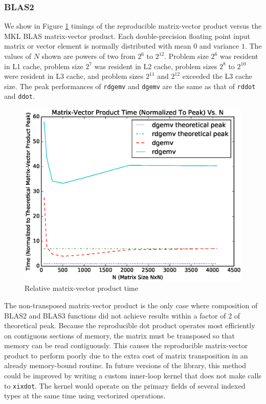   \subsubsection{BLAS2}
    We show in Figure \ref{fig:gemv_timings} timings of the reproducible matrix-vector product versus the MKL BLAS matrix-vector product. Each double-precision floating point input matrix or vector element is normally distributed with mean $0$ and variance $1$. The values of $N$ shown are powers of two from $2^6$ to $2^{12}$. Problem size $2^6$ was resident in L1 cache, problem size $2^7$ was resident in L2 cache, problem sizes $2^8$ to $2^{10}$ were resident in L3 cache, and problem sizes $2^{11}$ and $2^{12}$ exceeded the L3 cache size. The peak performances of \texttt{rdgemv} and \texttt{dgemv} are the same as that of \texttt{rddot} and \texttt{ddot}.
  \begin{figure}[H]
  \begin{center}
  \includegraphics[width=\textwidth]{plots/gemv_comparison}
  \caption{Relative matrix-vector product time}
  \label{fig:gemv_timings}
  \end{center}
  \end{figure}
  The non-transposed matrix-vector product is the only case where composition of BLAS2 and BLAS3 functions did not achieve results within a factor of 2 of theoretical peak. Because the reproducible dot product operates most efficiently on contiguous sections of memory, the matrix must be transposed so that memory can be read contiguously. This causes the reproducible matrix-vector product to perform poorly due to the extra cost of matrix transposition in an already memory-bound routine. In future versions of the library, this method could be improved by writing a custom inner-loop kernel that does not make calls to \texttt{xixdot}. The kernel would operate on the primary fields of several indexed types at the same time using vectorized operations.

